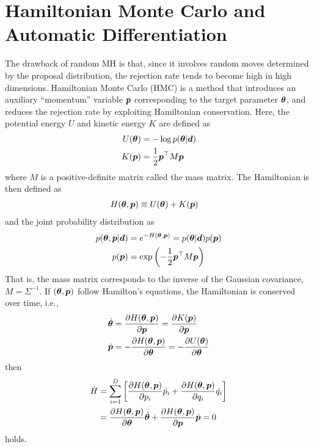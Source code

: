 \section{Hamiltonian Monte Carlo and Automatic Differentiation}

The drawback of random MH is that, since it involves random moves determined by the proposal distribution, the rejection rate tends to become high in high dimensions. Hamiltonian Monte Carlo (HMC) is a method that introduces an auxiliary ``momentum'' variable $\boldsymbol{p}$ corresponding to the target parameter $\boldsymbol{\theta}$, and reduces the rejection rate by exploiting Hamiltonian conservation. Here, the potential energy $U$ and kinetic energy $K$ are defined as
\begin{align}
    U(\boldsymbol{\theta}) &= - \log{p({\boldsymbol{\theta}}|\boldsymbol{d})} \\
    K(\boldsymbol{p}) &= \frac{1}{2} \boldsymbol{p}^\top M \boldsymbol{p}
\end{align}
where $M$ is a positive-definite matrix called the mass matrix. The Hamiltonian is then defined as
\begin{align}
    H(\boldsymbol{\theta}, \boldsymbol{p}) &\equiv U(\boldsymbol{\theta}) + K(\boldsymbol{p})
\end{align}
and the joint probability distribution as
\begin{align}
    p({\boldsymbol{\theta}}, \boldsymbol{p}|\boldsymbol{d}) &= e^{-H(\boldsymbol{\theta}, \boldsymbol{p})} = p({\boldsymbol{\theta}}|\boldsymbol{d}) p(\boldsymbol{p}) \\
    p(\boldsymbol{p}) &= \exp{\left( -\frac{1}{2} \boldsymbol{p}^\top M \boldsymbol{p}\right)}
\end{align}
That is, the mass matrix corresponds to the inverse of the Gaussian covariance, $M = \Sigma^{-1}$.
If $(\boldsymbol{\theta}, \boldsymbol{p})$ follow Hamilton's equations, the Hamiltonian is conserved over time, i.e.,
\begin{align}
    \dot{\boldsymbol{\theta}} &= \frac{\partial H(\boldsymbol{\theta}, \boldsymbol{p})}{\partial \boldsymbol{p}} = \frac{\partial K(\boldsymbol{p})}{\partial \boldsymbol{p}} \\
     \dot{\boldsymbol{p}} &= - \frac{\partial H(\boldsymbol{\theta}, \boldsymbol{p})}{\partial \boldsymbol{\theta}} = - \frac{\partial U(\boldsymbol{\theta})}{\partial \boldsymbol{\theta}}
\end{align}
then
\begin{align}
 \dot{H} &= \sum_{i=1}^D \left[\frac{\partial H(\boldsymbol{\theta}, \boldsymbol{p})}{\partial p_i} \dot{p_i} + \frac{\partial H(\boldsymbol{\theta}, \boldsymbol{p})}{\partial q_i} \dot{q_i} \right] \\
 &= \frac{\partial H(\boldsymbol{\theta}, \boldsymbol{p})}{\partial \boldsymbol{\theta}} \dot{\boldsymbol{\theta}} + \frac{\partial H(\boldsymbol{\theta}, \boldsymbol{p})}{\partial \boldsymbol{p}} \dot{\boldsymbol{p}} = 0
\end{align}
holds.

